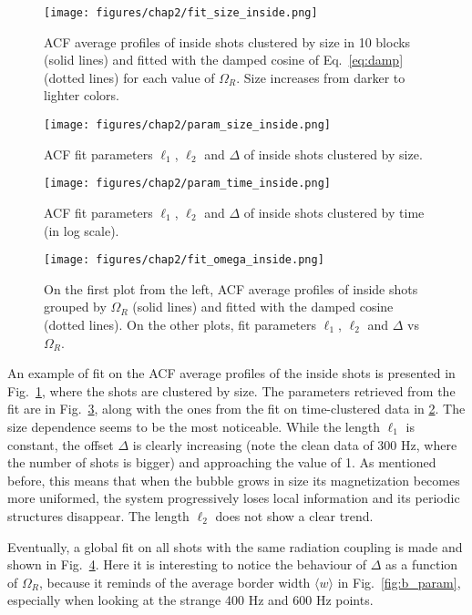 \begin{figure}[ht!]
    \centering
    \texttt{[image: figures/chap2/fit\_size\_inside.png]}
    \caption{ACF average profiles of inside shots clustered by size in 10 blocks (solid lines) and fitted with the damped cosine of Eq.\ \eqref{eq:damp} (dotted lines) for each value of $\Omega_R$. Size increases from darker to lighter colors.}
    \label{fig:fit_size_inside}
\end{figure}
\begin{figure}[ht!]
    \centering
    \texttt{[image: figures/chap2/param\_size\_inside.png]}
    \caption{ACF fit parameters $\ell_1$, $\ell_2$ and $\Delta$ of inside shots clustered by size.}
    \label{fig:param_size_inside}
\end{figure}
\begin{figure}[ht!]
    \centering
    \texttt{[image: figures/chap2/param\_time\_inside.png]}
    \caption{ACF fit parameters $\ell_1$, $\ell_2$ and $\Delta$ of inside shots clustered by time (in log scale).}
    \label{fig:param_time_inside}
\end{figure}
\begin{figure}[ht!]
    \centering
    \texttt{[image: figures/chap2/fit\_omega\_inside.png]}
    \caption{On the first plot from the left, ACF average profiles of inside shots grouped by $\Omega_R$ (solid lines) and fitted with the damped cosine (dotted lines). On the other plots, fit parameters $\ell_1$, $\ell_2$ and $\Delta$ vs $\Omega_R$.}
    \label{fig:fit_omega_inside}
\end{figure}
An example of fit on the ACF average profiles of the inside shots is presented in Fig.\ \ref{fig:fit_size_inside}, where the shots are clustered by size. The parameters retrieved from the fit are in Fig.\ \ref{fig:param_time_inside}, along with the ones from the fit on time-clustered data in \ref{fig:param_size_inside}. 
The size dependence seems to be the most noticeable. While the length $\ell_1$ is constant, the offset $\Delta$ is clearly increasing (note the clean data of 300 Hz, where the number of shots is bigger) and approaching the value of 1. As mentioned before, this means that when the bubble grows in size its magnetization becomes more uniformed, the system progressively loses local information and its periodic structures disappear. The length $\ell_2$ does not show a clear trend.

Eventually, a global fit on all shots with the same radiation coupling is made and shown in Fig.\ \ref{fig:fit_omega_inside}. Here it is interesting to notice the behaviour of $\Delta$ as a function of $\Omega_R$, because it reminds of the average border width $\langle w \rangle$ in Fig.\ \ref{fig:b_param}, especially when looking at the strange 400 Hz and 600 Hz points.

